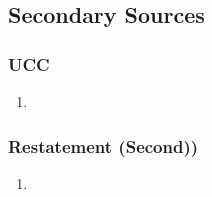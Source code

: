 
\subsection{Secondary Sources}

\subsubsection{UCC}

\begin{enumerate}
    \item %
\end{enumerate}

\subsubsection{Restatement (Second))}

\begin{enumerate}
    \item %
\end{enumerate}
